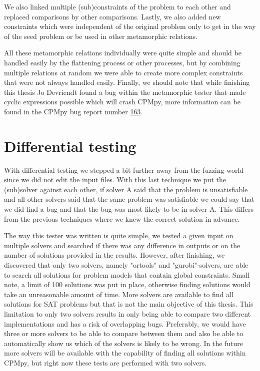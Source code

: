 We also linked multiple (sub)constraints of the problem to each other and replaced comparisons by other comparisons. Lastly, we also added new constraints which were independent of the original problem only to get in the way of the seed problem or be used in other metamorphic relations.

All these metamorphic relations individually were quite simple and should be handled easily by the flattening process or other processes, but by combining multiple relations at random we were able to create more complex constraints that were not always handled easily. Finally, we should note that while finishing this thesis Jo Devriendt found a bug within the metamorphic tester that made cyclic expressions possible which will crash CPMpy, more information can be found in the CPMpy bug report number \href{https://github.com/CPMpy/cpmpy/issues/163}{163}.

\section{Differential testing}
\label{impl:diff}
With differential testing we stepped a bit further away from the fuzzing world since we did not edit the input files.
With this last technique we put the (sub)solver against each other, if solver A said that the problem is unsatisfiable and all other solvers said that the same problem was satisfiable we could say that we did find a bug and that the bug was most likely to be in solver A. This differs from the previous techniques where we knew the correct solution in advance.


The way this tester was written is quite simple, we tested a given input on multiple solvers and searched if there was any difference in outputs or on the number of solutions provided in the results.
However, after finishing, we discovered that only two solvers, namely "ortools" and "gurobi"-solvers, are able to search all solutions for problem models that contain global constraints. Small note, a limit of 100 solutions was put in place, otherwise finding solutions would take an unreasonable amount of time. More solvers are available to find all solutions for SAT problems but that is not the main objective of this thesis. This limitation to only two solvers results in only being able to compare two different implementations and has a risk of overlapping bugs. Preferably, we would have three or more solvers to be able to compare between them and also be able to automatically show us which of the solvers is likely to be wrong. In the future more solvers will be available with the capability of finding all solutions within CPMpy, but right now these tests are performed with two solvers. 

